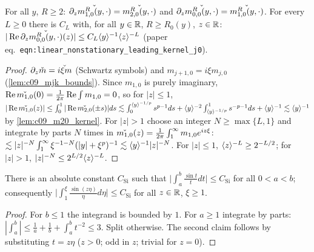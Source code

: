 \begin{lemma}
  \label{lem:c09_m10_m00_kernel}
  For all $y$, $R\ge2$: $\partial_z\widecheck{m^R_{1,0}(y,\cdot)}=\widecheck{m^R_{2,0}(y,\cdot)}$ and $\partial_z\widecheck{m^R_{0,0}(y,\cdot)}=\widecheck{m^R_{1,0}(y,\cdot)}$. For every $L\ge0$ there is $C_L$
  with, for all $y\in\R$, $R\ge R_0(y)$, $z\in\R$: $|\operatorname{Re}\partial_z\widecheck{m^R_{0,0}(y,\cdot)}(z)|\le C_L\ang{y}^{-1}\ang{z}^{-L}$
  (paper eq.~\texttt{eqn:linear\_nonstationary\_leading\_kernel\_j0}).
\end{lemma}
\begin{proof}
  $\partial_z\widecheck m=\widecheck{i\xi m}$ (Schwartz symbols) and $m_{j+1,0}=i\xi m_{j,0}$ (\cref{lem:c09_mjk_bounds}). Since $m_{1,0}$ is purely imaginary,
  $\operatorname{Re}\widecheck{m_{1,0}}(0)=\frac1{2\pi}\operatorname{Re}\int m_{1,0}=0$, so for $|z|\le1$, $|\operatorname{Re}\widecheck{m_{1,0}}(z)|\le\int_0^{1}|\operatorname{Re}\widecheck{m_{2,0}}(\pm s)|ds
  \lesssim\int_0^{\ang y^{-1/p}}s^{p-1}ds+\ang{y}^{-2}\int_{\ang y^{-1/p}}^1s^{-p-1}ds+\ang y^{-1}\lesssim\ang{y}^{-1}$ by \cref{lem:c09_m20_kernel}.
  For $|z|>1$ choose an integer $N\ge\max\{L,1\}$ and integrate by parts $N$ times in $\widecheck{m_{1,0}}(z)=\frac1{2\pi}\int_1^\infty m_{1,0}e^{iz\xi}$: $\lesssim|z|^{-N}\int_1^\infty\xi^{-1-N}(|y|+\xi^p)^{-1}\lesssim\ang y^{-1}|z|^{-N}$.
  For $|z|\le1$, $\ang z^{-L}\ge2^{-L/2}$; for $|z|>1$, $|z|^{-N}\le2^{L/2}\ang{z}^{-L}$.
\end{proof}

\begin{lemma}
  \label{lem:c09_sine_integral_bounded}
  There is an absolute constant $C_{\mathrm{Si}}$ such that $\bigl|\int_a^b\frac{\sin t}{t}dt\bigr|\le C_{\mathrm{Si}}$ for all $0<a<b$; consequently
  $\bigl|\int_1^\xi\frac{\sin(z\eta)}{\eta}d\eta\bigr|\le C_{\mathrm{Si}}$ for all $z\in\R$, $\xi\ge1$.
\end{lemma}
\begin{proof}
  For $b\le1$ the integrand is bounded by $1$. For $a\ge1$ integrate by parts: $|\int_a^b|\le\frac1a+\frac1b+\int_a^bt^{-2}\le3$. Split otherwise. The second
  claim follows by substituting $t=z\eta$ ($z>0$; odd in $z$; trivial for $z=0$).
\end{proof}

